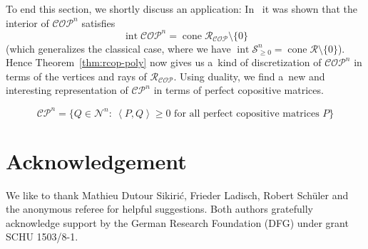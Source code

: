 \documentclass{commat}
\newcommand{\sR}{\mathcal{R}}
\DeclareMathOperator{\cone}{cone}
\DeclareMathOperator{\interior}{int}
\newcommand{\sngeo}{{\mathcal{S}}^{n}_{\geq0}}
\newcommand{\nonn}{{\mathcal{N}^{n}}}
\newcommand{\cop}{{\mathcal{COP}}}
\newcommand{\copn}{{\mathcal{COP}}^{n}}
\newcommand{\cpn}{{\mathcal{CP}}^{n}}
\begin{document}
To end this section, we shortly discuss an application:
In~\cite[Section 2.2]{dsv-2021} it was shown that the interior of \(\copn \) satisfies
\begin{equation}\label{eq:conesrequalintcop}
	\interior\copn = \cone\sR_\cop\setminus\{0\}
\end{equation}
(which generalizes the classical case, where we have \(\interior\sngeo=\cone\sR\setminus\{0\} \)).
Hence Theorem~\ref{thm:rcop-poly} now gives us a~kind of discretization of \(\copn \)
in terms of the vertices and rays of \(\sR_\cop \).
Using duality, we find a~new and interesting representation of \(\cpn \) in terms
of perfect copositive matrices.
\begin{corollary}
\[
	\cpn=\big\{
	 Q\in\nonn: \ \left<P,Q\right>\geq0 \text{ for all perfect copositive matrices $P$}
	\big\}
\]
\end{corollary}


\section*{Acknowledgement}

We like to thank Mathieu Dutour Sikiri\'{c}, Frieder Ladisch, Robert Sch\"{u}ler
and the anonymous referee for helpful suggestions.
Both authors gratefully acknowledge support by the German Research Foundation (DFG)
under grant SCHU 1503/8-1.
\end{document}
